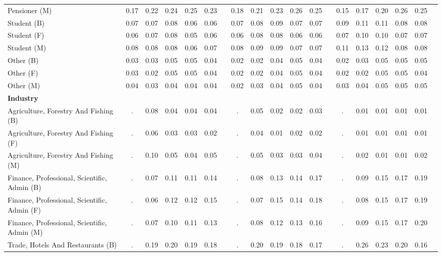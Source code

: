 \begin{tabular}{L{6.5cm} *{3}{*{5}{c} c}}
\quad Pensioner (M) & 0.17 & 0.22 & 0.24 & 0.25 & 0.23 & & 0.18 & 0.21 & 0.23 & 0.26 & 0.25 & & 0.15 & 0.17 & 0.20 & 0.26 & 0.25 & \\[5pt] 
\quad Student (B) & 0.07 & 0.07 & 0.08 & 0.06 & 0.06 & & 0.07 & 0.08 & 0.09 & 0.07 & 0.07 & & 0.09 & 0.11 & 0.11 & 0.08 & 0.08 & \\ 
\quad Student (F) & 0.06 & 0.07 & 0.08 & 0.05 & 0.06 & & 0.06 & 0.08 & 0.08 & 0.06 & 0.06 & & 0.07 & 0.10 & 0.10 & 0.07 & 0.07 & \\ 
\quad Student (M) & 0.08 & 0.08 & 0.08 & 0.06 & 0.07 & & 0.08 & 0.09 & 0.09 & 0.07 & 0.07 & & 0.11 & 0.13 & 0.12 & 0.08 & 0.08 & \\[5pt] 
\quad Other (B) & 0.03 & 0.03 & 0.05 & 0.05 & 0.04 & & 0.02 & 0.02 & 0.04 & 0.05 & 0.04 & & 0.02 & 0.03 & 0.05 & 0.05 & 0.05 & \\ 
\quad Other (F) & 0.03 & 0.02 & 0.05 & 0.05 & 0.04 & & 0.02 & 0.02 & 0.04 & 0.05 & 0.04 & & 0.02 & 0.02 & 0.05 & 0.05 & 0.04 & \\ 
\quad Other (M) & 0.04 & 0.03 & 0.04 & 0.04 & 0.04 & & 0.02 & 0.03 & 0.04 & 0.05 & 0.04 & & 0.03 & 0.04 & 0.05 & 0.05 & 0.05 & \\[5pt] 
\textbf{Industry}\\
\quad Agriculture, Forestry And Fishing (B) &   . & 0.08 & 0.04 & 0.04 & 0.04 & &   . & 0.05 & 0.02 & 0.02 & 0.03 & &   . & 0.01 & 0.01 & 0.01 & 0.01 & \\ 
\quad Agriculture, Forestry And Fishing (F) &   . & 0.06 & 0.03 & 0.03 & 0.02 & &   . & 0.04 & 0.01 & 0.02 & 0.02 & &   . & 0.01 & 0.01 & 0.01 & 0.01 & \\ 
\quad Agriculture, Forestry And Fishing (M) &   . & 0.10 & 0.05 & 0.04 & 0.05 & &   . & 0.05 & 0.03 & 0.03 & 0.04 & &   . & 0.02 & 0.01 & 0.01 & 0.02 & \\[5pt] 
\quad Finance, Professional, Scientific, Admin (B) &   . & 0.07 & 0.11 & 0.11 & 0.14 & &   . & 0.08 & 0.13 & 0.14 & 0.17 & &   . & 0.09 & 0.15 & 0.17 & 0.19 & \\ 
\quad Finance, Professional, Scientific, Admin (F) &   . & 0.06 & 0.12 & 0.12 & 0.15 & &   . & 0.07 & 0.15 & 0.14 & 0.18 & &   . & 0.08 & 0.15 & 0.17 & 0.19 & \\ 
\quad Finance, Professional, Scientific, Admin (M) &   . & 0.07 & 0.10 & 0.11 & 0.13 & &   . & 0.08 & 0.12 & 0.13 & 0.16 & &   . & 0.09 & 0.15 & 0.17 & 0.20 & \\[5pt] 
\quad Trade, Hotels And Restaurants  (B) &   . & 0.19 & 0.20 & 0.19 & 0.18 & &   . & 0.20 & 0.19 & 0.18 & 0.17 & &   . & 0.26 & 0.23 & 0.20 & 0.16 & \\ 

\end{tabular}
